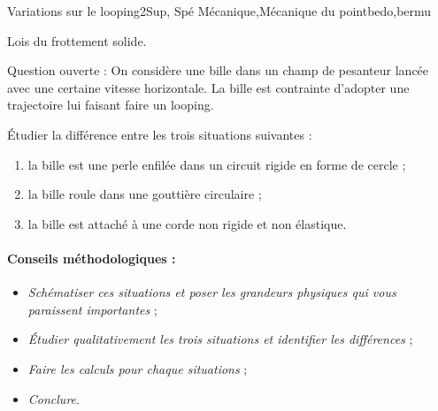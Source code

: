 
\begin{exercise}{Variations sur le looping}{2}{Sup, Spé}
{Mécanique,Mécanique du point}{bedo,bermu}

\begin{questions}
\questioncours Lois du frottement solide.

\bigskip

\question\textsf{Question ouverte :} On considère une bille dans un champ de pesanteur lancée avec une certaine vitesse horizontale. La bille est contrainte d'adopter une trajectoire lui faisant faire un looping.

\'Etudier la différence entre les trois situations suivantes :
\begin{enumerate}[label={\bfseries \sffamily (a)}]
    \item la bille est une perle enfilée dans un circuit rigide en forme de cercle ;
    \item la bille roule dans une gouttière circulaire ;
    \item la bille est attaché à une corde non rigide et non élastique.
\end{enumerate}

\end{questions}

\paragraph{Conseils méthodologiques :}
\begin{itemize}
    \item \textsl{Schématiser ces situations et poser les grandeurs physiques qui vous paraissent importantes} ;
    \item \textsl{\'Etudier qualitativement les trois situations et identifier les différences} ;
    \item \textsl{Faire les calculs pour chaque situations} ;
    \item \textsl{Conclure}.
\end{itemize}

\end{exercise}
